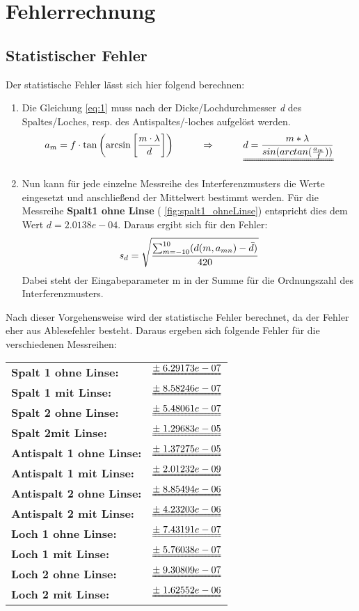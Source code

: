 \chapter{Fehlerrechnung}
\thispagestyle{fancy}
\section{Statistischer Fehler}
Der statistische Fehler lässt sich hier folgend berechnen:
\begin{enumerate}
\item Die Gleichung \ref{eq:1} muss nach der Dicke/Lochdurchmesser \textit{d} des Spaltes/Loches, resp. des Antispaltes/-loches aufgelöst werden.
\begin{equation}
\Large
a_{m}=f\cdot\tan\left( \arcsin\left[ \frac{m\cdot\lambda}{d}\right] \right)\qquad \Rightarrow \qquad \uuline{d=\frac{m*\lambda}{sin(arctan(\frac{a_{m}}{f}))}}
\end{equation}
\item Nun kann für jede einzelne Messreihe des Interferenzmusters die Werte eingesetzt und anschließend der Mittelwert bestimmt werden. Für die Messreihe \textbf{Spalt1 ohne Linse} ( \ref{fig:spalt1_ohneLinse}) entspricht dies dem Wert $d = 2.0138e-04$. Daraus ergibt sich für den Fehler:
\begin{equation}
\Large
s_{d}=\sqrt{\frac{\sum\nolimits_{m=-10}^{10}(d(m,a_{mn})-\bar{d})}{420}}
\end{equation}
Dabei steht der Eingabeparameter m in der Summe für die Ordnungszahl des Interferenzmusters.
\end{enumerate}
Nach dieser Vorgehensweise wird der statistische Fehler berechnet, da der Fehler eher aus Ablesefehler besteht. Daraus ergeben sich folgende Fehler für die verschiedenen Messreihen:
\\[0.5cm]
\begin{tabular}{ll}
\textbf{Spalt 1 ohne Linse:} & $\uuline{\pm\;6.29173e-07}$ \\ 
\textbf{Spalt 1 mit Linse:} & $\uuline{\pm\;8.58246e-07}$ \\ 
\textbf{Spalt 2 ohne Linse:} & $\uuline{\pm\;5.48061e-07}$ \\ 
\textbf{Spalt 2mit Linse:} & $\uuline{\pm\;1.29683e-05}$ \\ 
\textbf{Antispalt 1 ohne Linse:} & $\uuline{\pm\;1.37275e-05}$ \\ 
\textbf{Antispalt 1 mit Linse:} & $\uuline{\pm\;2.01232e-09}$ \\ 
\textbf{Antispalt 2 ohne Linse:} & $\uuline{\pm\;8.85494e-06}$ \\ 
\textbf{Antispalt 2 mit Linse:} & $\uuline{\pm\;4.23203e-06}$ \\ 
\textbf{Loch 1 ohne Linse:} & $\uuline{\pm\;7.43191e-07}$ \\ 
\textbf{Loch 1 mit Linse:} & $\uuline{\pm\;5.76038e-07}$ \\ 
\textbf{Loch 2 ohne Linse:} & $\uuline{\pm\;9.30809e-07}$ \\ 
\textbf{Loch 2 mit Linse:} & $\uuline{\pm\;1.62552e-06}$ \\ 
\end{tabular} 
